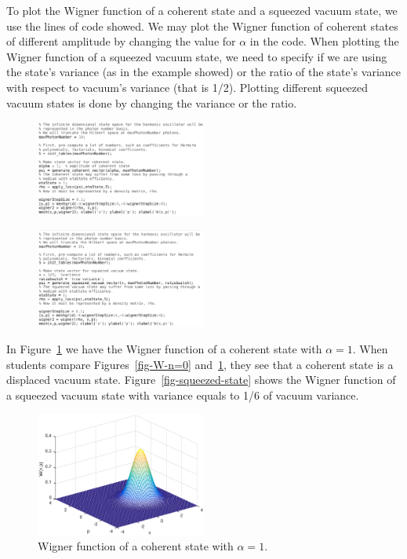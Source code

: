\documentclass[twocolumn]{rbef}
\begin{document}
To plot the Wigner function of a coherent state and a squeezed vacuum state, we use the lines of code showed. We may plot the Wigner function of coherent states of different amplitude by changing the value for $\alpha$ in the code. When plotting the Wigner function of a squeezed vacuum state, we need to specify if we are using the state's variance (as in the example showed) or the ratio of the state's variance with
respect to vacuum's variance (that is 1/2). Plotting different squeezed vacuum states is done by changing the variance or the ratio.

\begin{figure}[h!]
\includegraphics[width=0.5\textwidth]{wigner-coherent-alpha=1.eps}
\end{figure}
 
\begin{figure}[h!]
\includegraphics[width=0.5\textwidth]{wigner-squeezed.eps}
\end{figure}

In Figure~\ref{fig-coherent-alpha=1} we have the Wigner function of a coherent state with $\alpha = 1$. When students compare Figures~\ref{fig-W-n=0} and~\ref{fig-coherent-alpha=1}, they see that a coherent state is a displaced vacuum state. Figure~\ref{fig-squeezed-state} shows the Wigner function of a squeezed vacuum state with variance equals to 1/6 of vacuum variance.

\begin{figure}[h]
\includegraphics[width=0.5\textwidth]{coherent-alpha=1.eps}
\caption{Wigner function of a coherent state with $\alpha=1$.}
\label{fig-coherent-alpha=1}
\end{figure}
\end{document}
